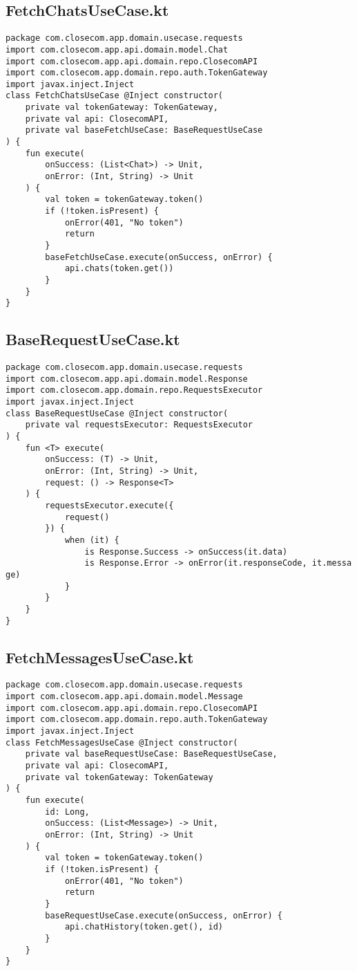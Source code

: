 \documentclass[listing]{espd}
\begin{document}
\subsection{FetchChatsUseCase.kt}
\begin{verbatim}
package com.closecom.app.domain.usecase.requests
import com.closecom.app.api.domain.model.Chat
import com.closecom.app.api.domain.repo.ClosecomAPI
import com.closecom.app.domain.repo.auth.TokenGateway
import javax.inject.Inject
class FetchChatsUseCase @Inject constructor(
    private val tokenGateway: TokenGateway,
    private val api: ClosecomAPI,
    private val baseFetchUseCase: BaseRequestUseCase
) {
    fun execute(
        onSuccess: (List<Chat>) -> Unit,
        onError: (Int, String) -> Unit
    ) {
        val token = tokenGateway.token()
        if (!token.isPresent) {
            onError(401, "No token")
            return
        }
        baseFetchUseCase.execute(onSuccess, onError) {
            api.chats(token.get())
        }
    }
}
\end{verbatim}

\subsection{BaseRequestUseCase.kt}
\begin{verbatim}
package com.closecom.app.domain.usecase.requests
import com.closecom.app.api.domain.model.Response
import com.closecom.app.domain.repo.RequestsExecutor
import javax.inject.Inject
class BaseRequestUseCase @Inject constructor(
    private val requestsExecutor: RequestsExecutor
) {
    fun <T> execute(
        onSuccess: (T) -> Unit,
        onError: (Int, String) -> Unit,
        request: () -> Response<T>
    ) {
        requestsExecutor.execute({
            request()
        }) {
            when (it) {
                is Response.Success -> onSuccess(it.data)
                is Response.Error -> onError(it.responseCode, it.messa
ge)
            }
        }
    }
}
\end{verbatim}

\subsection{FetchMessagesUseCase.kt}
\begin{verbatim}
package com.closecom.app.domain.usecase.requests
import com.closecom.app.api.domain.model.Message
import com.closecom.app.api.domain.repo.ClosecomAPI
import com.closecom.app.domain.repo.auth.TokenGateway
import javax.inject.Inject
class FetchMessagesUseCase @Inject constructor(
    private val baseRequestUseCase: BaseRequestUseCase,
    private val api: ClosecomAPI,
    private val tokenGateway: TokenGateway
) {
    fun execute(
        id: Long,
        onSuccess: (List<Message>) -> Unit,
        onError: (Int, String) -> Unit
    ) {
        val token = tokenGateway.token()
        if (!token.isPresent) {
            onError(401, "No token")
            return
        }
        baseRequestUseCase.execute(onSuccess, onError) {
            api.chatHistory(token.get(), id)
        }
    }
}
\end{verbatim}
\end{document}
